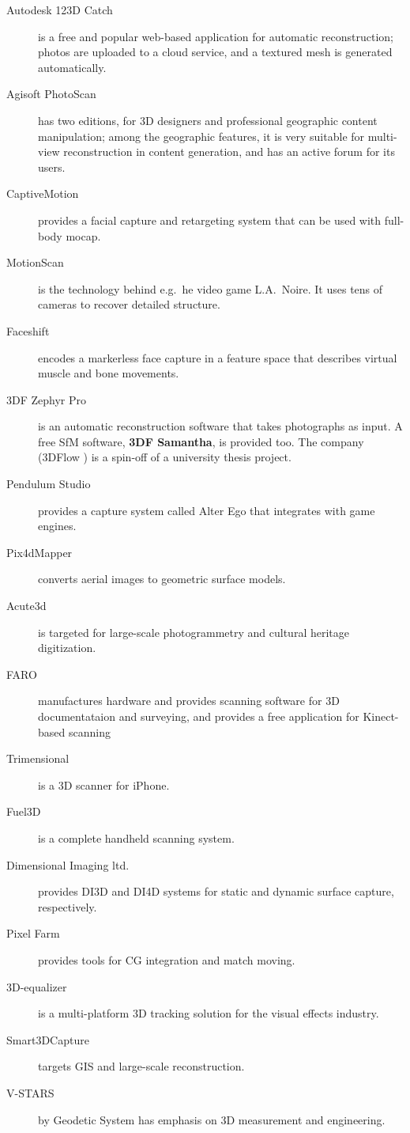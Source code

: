 \begin{description}
	\item[Autodesk 123D Catch] is a free and popular web-based application for automatic reconstruction; photos are uploaded to a cloud service, and a textured mesh is generated automatically.
	\item[Agisoft PhotoScan] has two editions, for 3D designers and professional geographic content manipulation; among the geographic features, it is very suitable for multi-view reconstruction in content generation, and has an active forum for its users.
	\item[CaptiveMotion] provides a facial capture and retargeting system that can be used with full-body mocap.
	\item[MotionScan] is the technology behind e.g.\ he video game L.A.\ Noire. \cite{rockstar2011noire} It uses tens of cameras to recover detailed structure.
	\item[Faceshift] encodes a markerless face capture in a feature space that describes virtual muscle and bone movements.
	\item[3DF Zephyr Pro] is an automatic reconstruction software that takes photographs as input. A free SfM software, \textbf{3DF Samantha}, is provided too. The company (3DFlow \cite{3dflow}) is a spin-off of a university thesis project. \cite{toldo2013accurate,toldo2013towards}
	\item[Pendulum Studio] provides a capture system called Alter Ego that integrates with game engines.
	\item[Pix4dMapper] converts aerial images to geometric surface models.
	\item[Acute3d] is targeted for large-scale photogrammetry and cultural heritage digitization.
	\item [FARO] manufactures hardware and provides scanning software for 3D documentataion and surveying, and provides a free application for Kinect-based scanning
	\item[Trimensional] is a 3D scanner for iPhone.
	\item[Fuel3D] is a complete handheld scanning system.
	\item[Dimensional Imaging ltd.] provides DI3D and DI4D systems for static and dynamic surface capture, respectively.
	\item[Pixel Farm] provides tools for CG integration and match moving.
	\item[3D-equalizer] is a multi-platform 3D tracking solution for the visual effects industry.
	\item[Smart3DCapture] targets GIS and large-scale reconstruction.
	\item[V-STARS] by Geodetic System has emphasis on 3D measurement and engineering.
\end{description}

